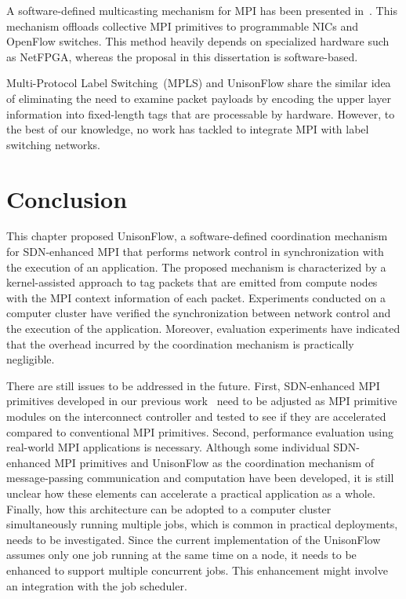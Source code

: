 A software-defined multicasting mechanism for MPI has been presented
in~\autocite{Arap2014}. This mechanism offloads collective MPI primitives to
programmable NICs and OpenFlow switches. This method heavily depends on
specialized hardware such as NetFPGA, whereas the proposal in this
dissertation is software-based.

Multi-Protocol Label Switching~(MPLS) and UnisonFlow share the similar
idea of eliminating the need to examine packet payloads by encoding
the upper layer information into fixed-length tags that are processable by
hardware. However, to the best of our knowledge, no work has tackled to
integrate MPI with label switching networks.

\section{Conclusion}\label{sec:iv-conclusion}

This chapter proposed UnisonFlow, a software-defined
coordination mechanism for SDN-enhanced MPI that performs network
control in synchronization with the execution of an application. The
proposed mechanism is characterized by a kernel-assisted approach to tag
packets that are emitted from compute nodes with the MPI context
information of each packet. Experiments conducted on a computer cluster
have verified the synchronization between network control and the
execution of the application. Moreover, evaluation experiments have
indicated that the overhead incurred by the coordination mechanism is
practically negligible.

There are still issues to be addressed in the future. First,
SDN-enhanced MPI primitives developed in our previous
work~\autocite{Dashdavaa2013,Takahashi2014} need to be adjusted as MPI
primitive modules on the interconnect controller and tested to see if
they are accelerated compared to conventional MPI primitives. Second,
performance evaluation using real-world MPI applications is necessary.
Although some individual SDN-enhanced MPI primitives and UnisonFlow as the
coordination mechanism of message-passing communication and computation have
been developed, it is still unclear how these elements can accelerate a
practical application as a whole. Finally, how this architecture can be
adopted to a computer cluster simultaneously running multiple jobs, which is
common in practical deployments, needs to be investigated. Since the current
implementation of the UnisonFlow assumes only one job running at the same time
on a node, it needs to be enhanced to support multiple concurrent jobs. This
enhancement might involve an integration with the job scheduler.
